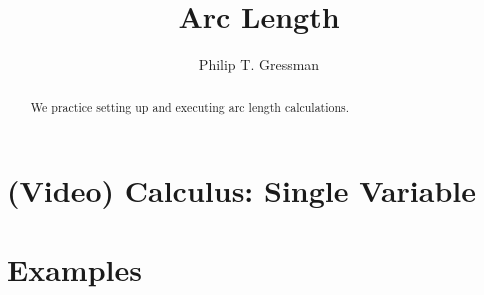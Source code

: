 \documentclass{ximera}
\title{Arc Length}
\author{Philip T. Gressman}
\begin{document}
\begin{abstract}
We practice setting up and executing arc length calculations.
\end{abstract}
\maketitle

\section*{(Video) Calculus: Single Variable}

\section*{Examples}
\end{document}
